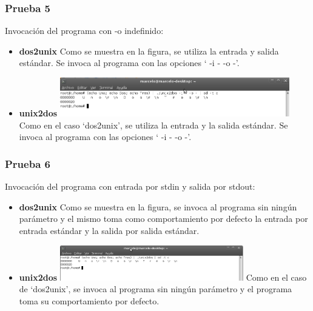 \documentclass[a4paper,10pt]{article}
\begin{document}
    \subsubsection{Prueba 5}
    Invocaci\'on del programa con -o indefinido:
      \begin{itemize}
      \item \textbf{dos2unix}
      \newline
      Como se muestra en la figura, se utiliza la entrada y salida est\'andar. Se invoca al programa con las opciones
      ` -i - -o -'.
      \item \textbf{unix2dos}
      \newline
      \includegraphics[width=10cm, viewport=0 0 895 152]{../Informe/Imagenes/prueba5-invocacion-unix2dos.png}	
      \newline
      Como en el caso `dos2unix', se utiliza la entrada y la salida est\'andar. Se invoca al programa con las opciones
      ` -i - -o -'.
      
      \end{itemize}


    \subsubsection{Prueba 6}
    Invocaci\'on del programa con entrada por stdin y salida por stdout:
      \begin{itemize}
      \item \textbf{dos2unix}
      \newline
      Como se muestra en la figura, se invoca al programa sin ning\'un par\'ametro y el mismo toma como comportamiento por defecto
      la entrada por entrada est\'andar y la salida por salida est\'andar.
      \item \textbf{unix2dos}
      \newline
      \includegraphics[width=8cm, viewport=0 0 904 174]{../Informe/Imagenes/prueba6-invocacion-unix2dos.png}	      
      \newline
      Como en el caso de `dos2unix', se invoca al programa sin ning\'un par\'ametro y el programa toma su comportamiento
      por defecto.
      
      \end{itemize}
\end{document}
